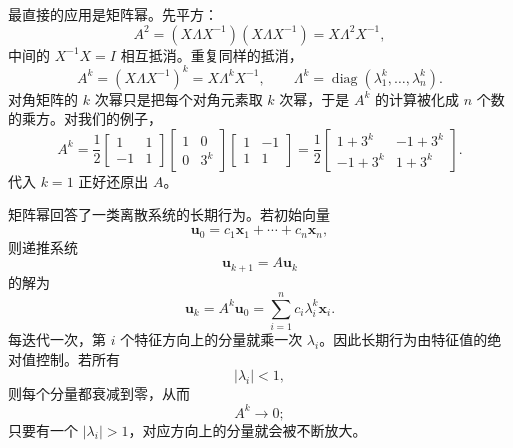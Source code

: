 \documentclass[UTF8,a4paper,12pt]{ctexart}
\numberwithin{equation}{section}
\begin{document}
	最直接的应用是矩阵幂。先平方：
	\begin{equation}\label{eq:7.33}
	A^2
	=(X\Lambda X^{-1})(X\Lambda X^{-1})
	=X\Lambda^2X^{-1},
	\end{equation}
	中间的 $X^{-1}X=I$ 相互抵消。重复同样的抵消，
	\begin{equation}\label{eq:7.34}
	A^k
	=(X\Lambda X^{-1})^k
	=X\Lambda^kX^{-1},
	\qquad
	\Lambda^k
	=
	\operatorname{diag}(\lambda_1^k,\ldots,\lambda_n^k).
	\end{equation}
	对角矩阵的 $k$ 次幂只是把每个对角元素取 $k$ 次幂，于是 $A^k$ 的计算被化成 $n$ 个数的乘方。对我们的例子，
	\begin{equation}\label{eq:7.35}
	A^k
	=\frac{1}{2}
	\begin{bmatrix}
		1&1\\
		-1&1
	\end{bmatrix}
	\begin{bmatrix}
		1&0\\
		0&3^k
	\end{bmatrix}
	\begin{bmatrix}
		1&-1\\
		1&1
	\end{bmatrix}
	=\frac{1}{2}
	\begin{bmatrix}
		1+3^k&-1+3^k\\
		-1+3^k&1+3^k
	\end{bmatrix}.
	\end{equation}
	代入 $k=1$ 正好还原出 $A$。

	矩阵幂回答了一类离散系统的长期行为。若初始向量
	\begin{equation}\label{eq:7.36}
	\bm{u}_0
	=c_1\bm{x}_1+\cdots+c_n\bm{x}_n,
	\end{equation}
	则递推系统
	\begin{equation}\label{eq:7.37}
	\bm{u}_{k+1}=A\bm{u}_k
	\end{equation}
	的解为
	\begin{equation}\label{eq:7.38}
	\bm{u}_k
	=A^k\bm{u}_0
	=
	\sum_{i=1}^{n}c_i\lambda_i^k\bm{x}_i.
	\end{equation}
	每迭代一次，第 $i$ 个特征方向上的分量就乘一次 $\lambda_i$。因此长期行为由特征值的绝对值控制。若所有
	\begin{equation}\label{eq:7.39}
	|\lambda_i|<1,
	\end{equation}
	则每个分量都衰减到零，从而
	\begin{equation}\label{eq:7.40}
	A^k\to 0;
	\end{equation}
	只要有一个 $|\lambda_i|>1$，对应方向上的分量就会被不断放大。
\end{document}

